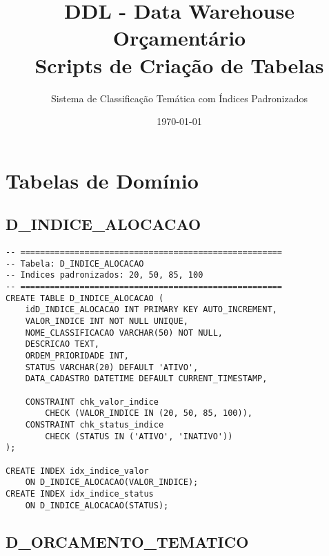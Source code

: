 \documentclass[12pt,a4paper]{article}
\title{DDL - Data Warehouse Orçamentário\\Scripts de Criação de Tabelas}
\author{Sistema de Classificação Temática com Índices Padronizados}
\date{\today}
\begin{document}
\maketitle

\tableofcontents
\newpage

\section{Tabelas de Domínio}

\subsection{D\_INDICE\_ALOCACAO}

\begin{lstlisting}
-- =====================================================
-- Tabela: D_INDICE_ALOCACAO
-- Indices padronizados: 20, 50, 85, 100
-- =====================================================
CREATE TABLE D_INDICE_ALOCACAO (
    idD_INDICE_ALOCACAO INT PRIMARY KEY AUTO_INCREMENT,
    VALOR_INDICE INT NOT NULL UNIQUE,
    NOME_CLASSIFICACAO VARCHAR(50) NOT NULL,
    DESCRICAO TEXT,
    ORDEM_PRIORIDADE INT,
    STATUS VARCHAR(20) DEFAULT 'ATIVO',
    DATA_CADASTRO DATETIME DEFAULT CURRENT_TIMESTAMP,
    
    CONSTRAINT chk_valor_indice 
        CHECK (VALOR_INDICE IN (20, 50, 85, 100)),
    CONSTRAINT chk_status_indice 
        CHECK (STATUS IN ('ATIVO', 'INATIVO'))
);

CREATE INDEX idx_indice_valor 
    ON D_INDICE_ALOCACAO(VALOR_INDICE);
CREATE INDEX idx_indice_status 
    ON D_INDICE_ALOCACAO(STATUS);
\end{lstlisting}

\subsection{D\_ORCAMENTO\_TEMATICO}
\end{document}
